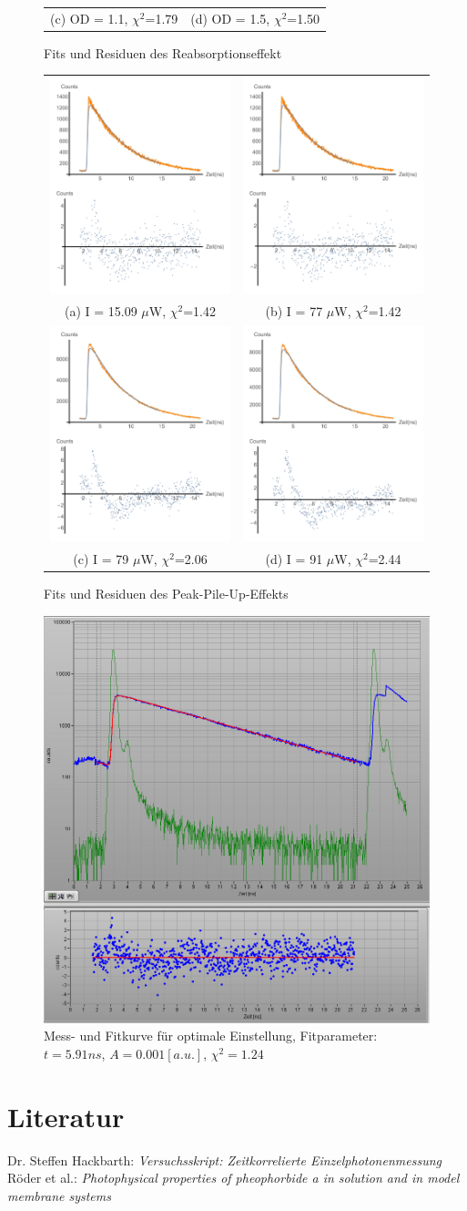 \documentclass{article}
\begin{document}
\begin{figure}
\begin{tabular}{cc}
  (c) OD = 1.1, $\chi^2$=1.79                                 &   (d) OD = 1.5, $\chi^2$=1.50                               \\

\end{tabular}
\caption{Fits und Residuen des Reabsorptionseffekt}
\end{figure}


\begin{figure}
\begin{tabular}{cc}
  \includegraphics[width=\textwidth/2]{Bilder/Fit1509uW.jpg}  &   \includegraphics[width=\textwidth/2]{Bilder/Fit7700uW.jpg}\\
  (a) I = 15.09 $\mu$W, $\chi^2$=1.42                            &   (b) I = 77 $\mu$W, $\chi^2$=1.42                             \\
  \includegraphics[width=\textwidth/2]{Bilder/Fit7900uW.jpg}  &   \includegraphics[width=\textwidth/2]{Bilder/Fit9100uW.jpg}\\
  (c) I = 79 $\mu$W, $\chi^2$=2.06                               &   (d) I = 91 $\mu$W, $\chi^2$=2.44                             \\

\end{tabular}
\caption{Fits und Residuen des Peak-Pile-Up-Effekts}
\end{figure}


\begin{figure}
  \centering
  \includegraphics[width=\textwidth]{Bilder/messung_opt.jpg}
  \caption{Mess- und Fitkurve für optimale Einstellung, Fitparameter: $t=5.91ns$, $A=0.001[a.u.]$, $\chi^2=1.24$}
\end{figure}


\newpage


\section{Literatur}

\begingroup
\renewcommand{\section}[2]{}
\begin{thebibliography}{20}
         Dr. Steffen Hackbarth: \textit{Versuchsskript: Zeitkorrelierte Einzelphotonenmessung}
         Röder et al.: \textit{Photophysical properties of pheophorbide a in solution and in model membrane systems}
\end{thebibliography}
\endgroup
\end{document}
